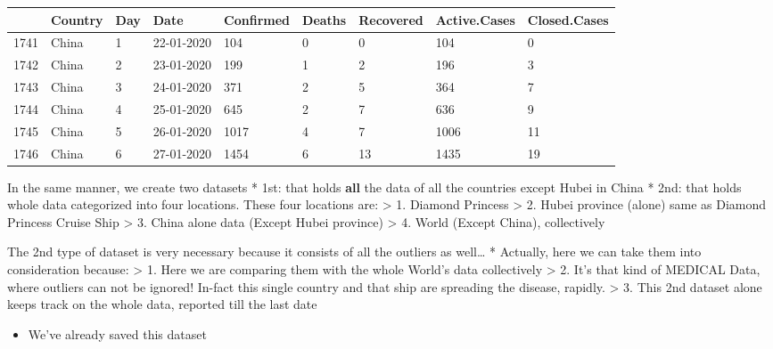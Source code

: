 \documentclass[11pt]{article}
\providecommand{\tightlist}{%
      \setlength{\itemsep}{0pt}\setlength{\parskip}{0pt}}
\begin{document}
    \begin{tabular}{r|llllllll}
  & Country & Day & Date & Confirmed & Deaths & Recovered & Active.Cases & Closed.Cases\\
\hline
	1741 & China      & 1          & 22-01-2020 &  104       & 0          &  0         &  104       &  0        \\
	1742 & China      & 2          & 23-01-2020 &  199       & 1          &  2         &  196       &  3        \\
	1743 & China      & 3          & 24-01-2020 &  371       & 2          &  5         &  364       &  7        \\
	1744 & China      & 4          & 25-01-2020 &  645       & 2          &  7         &  636       &  9        \\
	1745 & China      & 5          & 26-01-2020 & 1017       & 4          &  7         & 1006       & 11        \\
	1746 & China      & 6          & 27-01-2020 & 1454       & 6          & 13         & 1435       & 19        \\
\end{tabular}


    
     In the same manner, we create two datasets * 1st: that holds
\textbf{all} the data of all the countries except Hubei in China * 2nd:
that holds whole data categorized into four locations. These four
locations are: \textgreater{} 1. Diamond Princess \textgreater{} 2.
Hubei province (alone) same as Diamond Princess Cruise Ship
\textgreater{} 3. China alone data (Except Hubei province)
\textgreater{} 4. World (Except China), collectively

The 2nd type of dataset is very necessary because it consists of all the
outliers as well\ldots{} * Actually, here we can take them into
consideration because: \textgreater{} 1. Here we are comparing them with
the whole World's data collectively \textgreater{} 2. It's that kind of
MEDICAL Data, where outliers can not be ignored! In-fact this single
country and that ship are spreading the disease, rapidly. \textgreater{}
3. This 2nd dataset alone keeps track on the whole data, reported till
the last date

\begin{itemize}
\tightlist
\item
  We've already saved this dataset 
\end{itemize}
\end{document}
